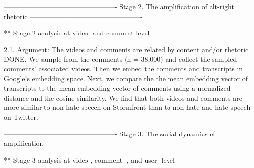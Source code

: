 -------------------------------------------------
Stage 2. The amplification of alt-right rhetoric
-------------------------------------------------

** Stage 2 analysis at video- and comment level

2.1. Argument: The videos and comments are related by content and/or rhetoric
DONE. We sample from the comments (n = 38,000) and collect the sampled comments' associated videos. Then we embed the comments and transcripts in Google's embedding space. Next, we compare the the mean embedding vector of transcripts to the mean embedding vector of comments using a normalized distance and the cosine similarity. We find that both videos and comments are more similar to non-hate speech on Stormfront than to non-hate and hate-speech on Twitter.



-------------------------------------------------
Stage 3. The social dynamics of amplification
-------------------------------------------------

** Stage 3 analysis at video-, comment- , and user- level